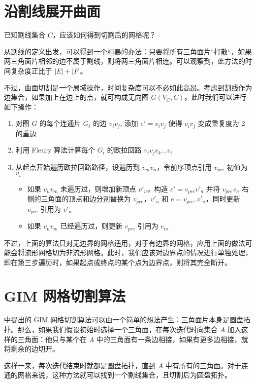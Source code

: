 \section{沿割线展开曲面}

已知割线集合 $ C $，应该如何得到切割后的网格呢？

从割线的定义出发，可以得到一个粗暴的办法：只要将所有三角面片“打散“，如果两三角面片相邻的边不属于割线，则将两三角面片相连。可以观察到，此方法的时间复杂度正比于 $ | E | + | F | $。

不过，曲面切割是一个局域操作，时间复杂度可以不必如此高昂。考虑到割线作为边集合，如果加上在边上的点，就可构成无向图 $ G(V_C, C) $。此时我们可以进行如下操作：
\begin{enumerate}
  \item 对图 $ G $ 的每个连通片 $ G_i $ 的边 $ v_iv_j $, 添加 $ e' = v_i v_j $ 使得 $ v_i v_j $ 变成重复度为 2 的重边
  \item 利用 Fleury 算法计算每个 $ G_i $ 的欧拉回路 $ v_i v_j v_k ... v_i $
  \item 从起点开始遍历欧拉回路路径，设遍历到 $ v_m v_n $，令前序顶点引用 $ v_{pre} $ 初值为 $ v_i $
        \begin{itemize}
          \item 如果 $ v_n v_m $ 未遍历过，则增加新顶点 $ v'_n $。构造 $ e' = v_{pre} v’_n $ 并将 $ v_{pre} v_n $ 右侧的三角面的顶点和边分别替换为 $ v_{pre} $，$ v'_n $ 和 $ e = v_{pre}, v'_n $，同时更新 $ v_{pre} $ 引用为 $ v'_n $
          \item 如果 $ v_n v_m $ 已经遍历过，则更新 $ v_{pre} $ 引用为 $ v_m $
        \end{itemize}
\end{enumerate}

不过，上面的算法只对无边界的网格适用，对于有边界的网格，应用上面的做法可能会将流形网格切为非流形网格。此时，我们应该对边界点的情况进行单独处理，即在第三步遍历时，如果起点或终点的某个点为边界点，则将其完全断开。

\section{GIM 网格切割算法}

\citet{Gu2002} 中提出的 GIM 网格切割算法可以由一个简单的想法产生：三角面片本身是圆盘拓扑。那么，如果我们假设初始时选择一个三角面，在每次迭代时向集合 $ A $ 加入这样的三角面：他只与某个在 $ A $ 中的三角面有一条边相接，如果有更多边相接，就将剩余的边切开。

这样一来，每次迭代结束时就都是圆盘拓扑，直到 $ A $ 中有所有的三角面。对于连通的网格来说，这种方法就可以找到一个割线集合，且切割后为圆盘拓扑。

